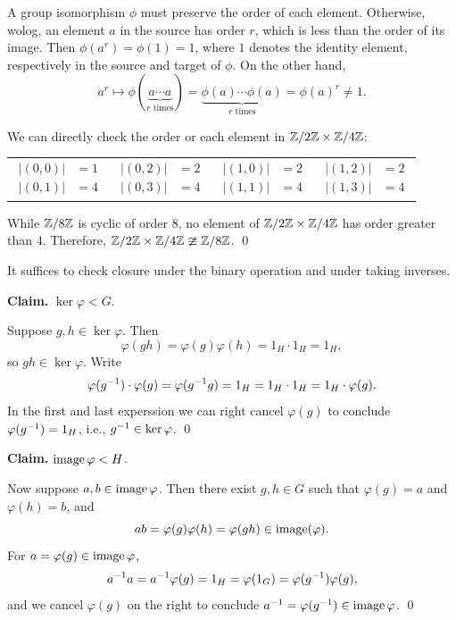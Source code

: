 \documentclass[../algebraNotesMSRI-UP2016.tex]{subfiles}
\begin{document}
\begin{frame}
A group isomorphism $\phi$ must preserve the order of each element.  Otherwise, wolog, an element $a$ in the source has order $r$, which is less than the order of its image.  Then $\phi(a^r)=\phi(1)=1$, where $1$ denotes the identity element, respectively in the source and target of $\phi$.  On the other hand,
\[
a^r\mapsto \phi{(\underbrace{a\cdots a}_{\text{$r$ times}})}=\underbrace{\phi(a)\cdots \phi(a)}_{\text{$r$ times}}=\phi(a)^r\neq 1.
\]

\smallGap
We can directly check the order or each element in $\mathbb Z/2\mathbb Z\times \mathbb Z/4\mathbb Z$:

\vspace{-0.75pc}
\begin{tabular}{p{}p{}p{}p{}}
{\begin{align*}
|(0,0)| &= 1 \\
|(0,1)| &= 4 
\end{align*}
} & {\begin{align*}
|(0,2)| &= 2 \\
|(0,3)| &= 4 
\end{align*}
} & {\begin{align*}
|(1,0)| &= 2 \\
|(1,1)| &= 4 
\end{align*}
} & {\begin{align*}
|(1,2)| &= 2 \\
|(1,3)| &= 4
\end{align*}
}
\end{tabular}

While $\mathbb Z/8\mathbb Z$ is cyclic of order $8$, no element of $\mathbb Z/2\mathbb Z\times \mathbb Z/4\mathbb Z$ has order greater than $4$.  Therefore, $\mathbb Z/2\mathbb Z\times\mathbb Z/4\mathbb Z\ncong \mathbb Z/8\mathbb Z$.
\qed
\end{frame}

\begin{frame}
It suffices to check closure under the binary operation and under taking inverses.

\smallGap
\textbf{Claim.} $\ker\varphi<G$.

Suppose $g,h\in \ker\varphi$.  Then 
\[
\varphi(gh)=\varphi(g)\varphi(h)=1_H\cdot 1_H = 1_H,
\]
so $gh\in \ker\varphi$.  Write  
\[
\varphi(g^{-1})\cdot \varphi(g)=\varphi(g^{-1}g)=1_H=1_H\cdot 1_H=1_H\cdot \varphi(g).
\]
In the first and last experssion we can right cancel $\varphi(g)$ to conclude $\varphi(g^{-1})=1_H$, i.e., $g^{-1}\in\ker\varphi$.   
\qed
\end{frame}

\begin{frame}[c]
\textbf{Claim.} $\operatorname{image}\varphi<H$.

Now suppose $a,b\in \operatorname{image}\varphi$.  Then there exist $g,h\in G$ such that $\varphi(g)=a$ and $\varphi(h)=b$, and 
\[
ab=\varphi(g)\varphi(h)=\varphi(gh)\in \operatorname{image}(\varphi).
\]
For $a=\varphi(g)\in \operatorname{image}{\varphi}$,
\[
a^{-1}a=a^{-1}\varphi(g)=1_H=\varphi(1_G)=\varphi(g^{-1})\varphi(g),
\]
and we cancel $\varphi(g)$ on the right to conclude $a^{-1}=\varphi(g^{-1})\in \operatorname{image}\varphi$.
\qed
\end{frame}

\end{document}
